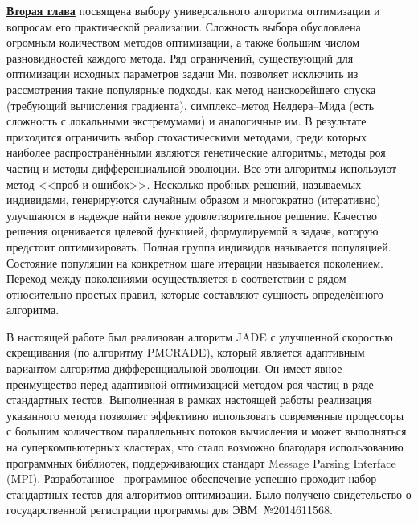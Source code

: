 \underline{\textbf{Вторая глава}} посвящена выбору универсального
алгоритма оптимизации и вопросам его практической
реализации. Сложность выбора обусловлена огромным количеством методов
оптимизации, а также большим числом разновидностей каждого метода. Ряд
ограничений, существующий для оптимизации исходных параметров задачи
Ми, позволяет исключить из рассмотрения такие популярные подходы, как
метод наискорейшего спуска (требующий вычисления градиента),
симплекс--метод Нелдера--Мида (есть сложность с локальными
экстремумами) и аналогичные им. В результате приходится ограничить
выбор стохастическими методами, среди которых наиболее
распространёнными являются генетические алгоритмы, методы роя частиц и
методы дифференциальной эволюции.  Все эти алгоритмы используют метод
<<проб и ошибок>>.  Несколько пробных решений, называемых индивидами,
генерируются случайным образом и многократно (итеративно) улучшаются в
надежде найти некое удовлетворительное решение. Качество решения
оценивается целевой функцией, формулируемой в задаче, которую
предстоит оптимизировать.  Полная группа индивидов называется
популяцией.  Состояние популяции на конкретном шаге итерации
называется поколением.  Переход между поколениями осуществляется в
соответствии с рядом относительно простых правил, которые составляют
сущность определённого алгоритма.


В настоящей работе был реализован алгоритм JADE с улучшенной
скоростью скрещивания (по алгоритму PMCRADE), который является
адаптивным вариантом алгоритма дифференциальной эволюции. Он имеет
явное преимущество перед адаптивной оптимизацией методом роя частиц в
ряде стандартных тестов.  Выполненная в рамках настоящей работы
реализация указанного метода позволяет эффективно использовать
современные процессоры с большим количеством параллельных потоков
вычисления и может выполняться на суперкомпьютерных кластерах, что
стало возможно благодаря использованию программных библиотек,
поддерживающих стандарт Message Parsing Interface (MPI).
Разработанное~\cite{JADE-web} программное обеспечение успешно проходит
набор стандартных тестов для алгоритмов оптимизации.  Было получено
свидетельство о государственной регистрации программы для
ЭВМ~№2014611568.


